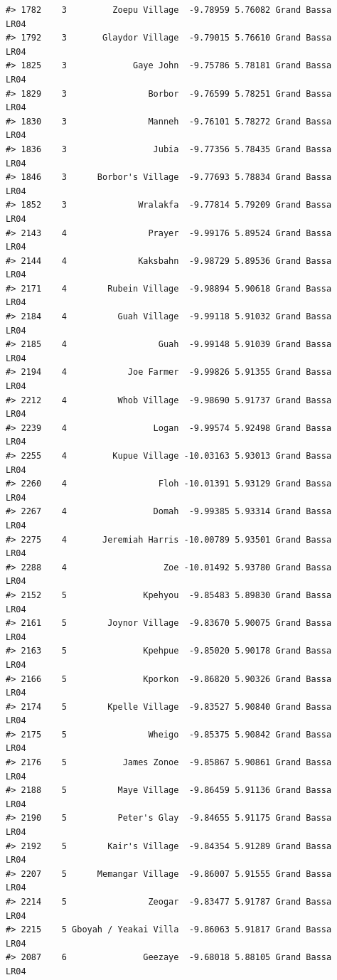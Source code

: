 \documentclass[12pt,a4paper]{book}
\theoremstyle{definition}
\theoremstyle{definition}
\theoremstyle{definition}
\theoremstyle{remark}
\begin{document}
\begin{verbatim}
#> 1782    3         Zoepu Village  -9.78959 5.76082 Grand Bassa       LR04
#> 1792    3       Glaydor Village  -9.79015 5.76610 Grand Bassa       LR04
#> 1825    3             Gaye John  -9.75786 5.78181 Grand Bassa       LR04
#> 1829    3                Borbor  -9.76599 5.78251 Grand Bassa       LR04
#> 1830    3                Manneh  -9.76101 5.78272 Grand Bassa       LR04
#> 1836    3                 Jubia  -9.77356 5.78435 Grand Bassa       LR04
#> 1846    3      Borbor's Village  -9.77693 5.78834 Grand Bassa       LR04
#> 1852    3              Wralakfa  -9.77814 5.79209 Grand Bassa       LR04
#> 2143    4                Prayer  -9.99176 5.89524 Grand Bassa       LR04
#> 2144    4              Kaksbahn  -9.98729 5.89536 Grand Bassa       LR04
#> 2171    4        Rubein Village  -9.98894 5.90618 Grand Bassa       LR04
#> 2184    4          Guah Village  -9.99118 5.91032 Grand Bassa       LR04
#> 2185    4                  Guah  -9.99148 5.91039 Grand Bassa       LR04
#> 2194    4            Joe Farmer  -9.99826 5.91355 Grand Bassa       LR04
#> 2212    4          Whob Village  -9.98690 5.91737 Grand Bassa       LR04
#> 2239    4                 Logan  -9.99574 5.92498 Grand Bassa       LR04
#> 2255    4         Kupue Village -10.03163 5.93013 Grand Bassa       LR04
#> 2260    4                  Floh -10.01391 5.93129 Grand Bassa       LR04
#> 2267    4                 Domah  -9.99385 5.93314 Grand Bassa       LR04
#> 2275    4       Jeremiah Harris -10.00789 5.93501 Grand Bassa       LR04
#> 2288    4                   Zoe -10.01492 5.93780 Grand Bassa       LR04
#> 2152    5               Kpehyou  -9.85483 5.89830 Grand Bassa       LR04
#> 2161    5        Joynor Village  -9.83670 5.90075 Grand Bassa       LR04
#> 2163    5               Kpehpue  -9.85020 5.90178 Grand Bassa       LR04
#> 2166    5               Kporkon  -9.86820 5.90326 Grand Bassa       LR04
#> 2174    5        Kpelle Village  -9.83527 5.90840 Grand Bassa       LR04
#> 2175    5                Wheigo  -9.85375 5.90842 Grand Bassa       LR04
#> 2176    5           James Zonoe  -9.85867 5.90861 Grand Bassa       LR04
#> 2188    5          Maye Village  -9.86459 5.91136 Grand Bassa       LR04
#> 2190    5          Peter's Glay  -9.84655 5.91175 Grand Bassa       LR04
#> 2192    5        Kair's Village  -9.84354 5.91289 Grand Bassa       LR04
#> 2207    5      Memangar Village  -9.86007 5.91555 Grand Bassa       LR04
#> 2214    5                Zeogar  -9.83477 5.91787 Grand Bassa       LR04
#> 2215    5 Gboyah / Yeakai Villa  -9.86063 5.91817 Grand Bassa       LR04
#> 2087    6               Geezaye  -9.68018 5.88105 Grand Bassa       LR04

\end{verbatim}
\end{document}
